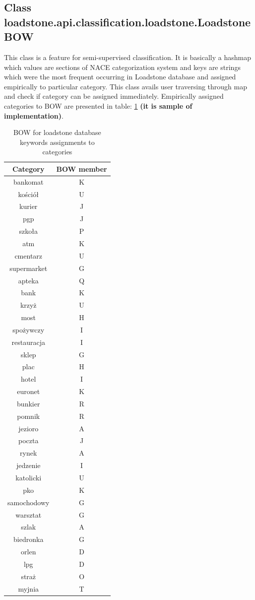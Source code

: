 \subsection{Class \newline loadstone.api.classification.loadstone.LoadstoneBOW}
\label{loadstone_bow}
This class is a feature for semi-supervised classification. It is basically a hashmap which values are sections of NACE categorization system and keys are strings which were the most frequent occurring in Loadstone database and assigned empirically to particular category. This class avails user traversing through map and check if category can be assigned immediately. Empirically assigned categories to BOW are presented in table: \ref{tab:BowMatching} \textbf{(it is sample of implementation)}.
\begin{table}
	\centering 
	\begin{tabular}{ | c | c |}
		\hline   
		Category  & BOW member\tabularnewline \hline
		bankomat  & K\\\hline
		kościół & U\\\hline
		kurier&J\\\hline
		pgp & J\\\hline
		szkoła & P\\\hline
		atm & K\\\hline
		cmentarz & U\\\hline
		supermarket & G\\\hline
		apteka & Q\\\hline
		bank & K\\\hline
		krzyż & U\\\hline
		most & H\\\hline
		spożywczy & I\\\hline
		restauracja & I\\\hline
		sklep & G\\\hline
		plac & H\\\hline
		hotel & I\\\hline
		euronet & K\\\hline
		bunkier & R\\\hline
		pomnik & R\\\hline
		jezioro & A\\\hline
		poczta & J\\\hline
		rynek & A\\\hline
		jedzenie & I\\\hline
		katolicki & U\\\hline
		pko & K\\\hline
		samochodowy & G\\\hline
		warsztat & G\\\hline
		szlak & A\\\hline
		biedronka & G\\\hline
		orlen & D\\\hline
		lpg & D\\\hline
		straż & O\\\hline
		myjnia & T\\\hline
	\end{tabular}
	\caption{BOW for loadstone database keywords assignments to categories}
	\label{tab:BowMatching}
\end{table} 

